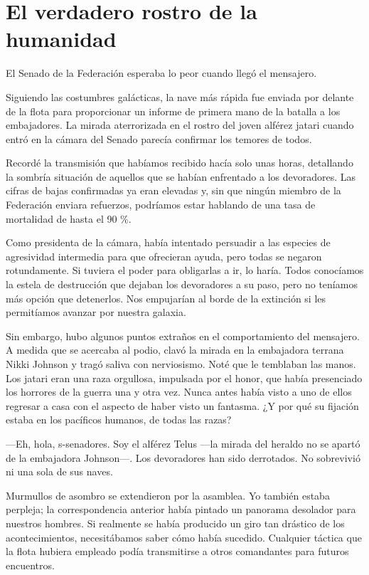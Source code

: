 ﻿\chapter{El verdadero rostro de la humanidad}\label{sec:el-verdadero-rostro-de-la-humanidad}

El Senado de la Federación esperaba lo peor cuando llegó el mensajero.

Siguiendo las costumbres galácticas, la nave más rápida fue enviada por delante de la flota para proporcionar un informe de primera mano de la batalla a los embajadores. La mirada aterrorizada en el rostro del joven alférez jatari cuando entró en la cámara del Senado parecía confirmar los temores de todos.

Recordé la transmisión que habíamos recibido hacía solo unas horas, detallando la sombría situación de aquellos que se habían enfrentado a los devoradores. Las cifras de bajas confirmadas ya eran elevadas y, sin que ningún miembro de la Federación enviara refuerzos, podríamos estar hablando de una tasa de mortalidad de hasta el 90 \%.

Como presidenta de la cámara, había intentado persuadir a las especies de agresividad intermedia para que ofrecieran ayuda, pero todas se negaron rotundamente. Si tuviera el poder para obligarlas a ir, lo haría. Todos conocíamos la estela de destrucción que dejaban los devoradores a su paso, pero no teníamos más opción que detenerlos. Nos empujarían al borde de la extinción si les permitíamos avanzar por nuestra galaxia.

Sin embargo, hubo algunos puntos extraños en el comportamiento del mensajero. A medida que se acercaba al podio, clavó la mirada en la embajadora terrana Nikki Johnson y tragó saliva con nerviosismo. Noté que le temblaban las manos. Los jatari eran una raza orgullosa, impulsada por el honor, que había presenciado los horrores de la guerra una y otra vez. Nunca antes había visto a uno de ellos regresar a casa con el aspecto de haber visto un fantasma. ¿Y por qué su fijación estaba en los pacíficos humanos, de todas las razas?

—Eh, hola, s-senadores. Soy el alférez Telus —la mirada del heraldo no se apartó de la embajadora Johnson—. Los devoradores han sido derrotados. No sobrevivió ni una sola de sus naves.

Murmullos de asombro se extendieron por la asamblea. Yo también estaba perpleja; la correspondencia anterior había pintado un panorama desolador para nuestros hombres. Si realmente se había producido un giro tan drástico de los acontecimientos, necesitábamos saber cómo había sucedido. Cualquier táctica que la flota hubiera empleado podía transmitirse a otros comandantes para futuros encuentros.


